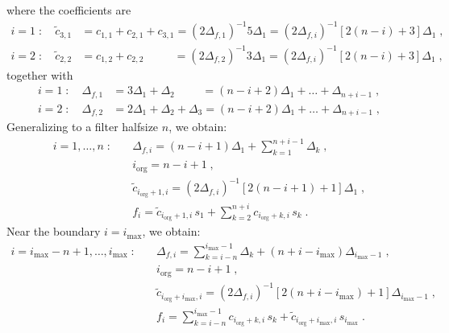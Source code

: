 where the coefficients are
\begin{subequations}
  \begin{align}
    i=1\;:\quad\tilde{c}_{3,1} &= c_{1,1}+c_{2,1}+c_{3,1} =(2\Delta_{f,1})^{-1}5\Delta_{1}
    =(2\Delta_{f,i})^{-1}[2(n-i)+3]\Delta_{1}\;,\\
    i=2\;:\quad\tilde{c}_{2,2} &= c_{1,2}+c_{2,2}\phantom{(+c_{3,1}} =(2\Delta_{f,2})^{-1}3\Delta_{1}
    =(2\Delta_{f,i})^{-1}[2(n-i)+3]\Delta_{1}\;,
  \end{align}
\end{subequations}
together with
\begin{subequations}
  \begin{align}
    i=1\;:\quad\Delta_{f,1}&=3\Delta_{1}+\Delta_{2}\phantom{+\Delta_{3})}=
    (n-i+2)\Delta_{1}+\ldots+\Delta_{n+i-1}\;,\\
    i=2\;:\quad\Delta_{f,2}&=2\Delta_{1}+\Delta_{2}+\Delta_{3}=
    (n-i+2)\Delta_{1}+\ldots+\Delta_{n+i-1}\;,
  \end{align}
\end{subequations}
Generalizing to a filter halfsize $n$, we obtain:
\begin{subequations}
  \begin{align}
    i=1,\ldots,n\;:\quad 
    & \Delta_{f,i} = (n-i+1)\Delta_{1}+\sum_{k=1}^{n+i-1}\Delta_{k} \;,\\
    & i_\mathrm{org}=n-i+1\;,\\
    &\tilde{c}_{i_\mathrm{org}+1,i} = (2\Delta_{f,i})^{-1}[2(n-i+1)+1]\Delta_{1}\;,\\
    &f_{i} =\tilde{c}_{i_\mathrm{org}+1,i}\,s_1+\sum_{k=2}^{n+i} c_{i_\mathrm{org}+k,i}\,s_{k} \;.
  \end{align}
\end{subequations}
Near the boundary $i=i_\mathrm{max}$, we obtain:
\begin{subequations}
  \begin{align}
    i=i_\mathrm{max}-n+1,\ldots,i_\mathrm{max}\;:\quad 
    & \Delta_{f,i} = \sum_{k=i-n}^{i_\mathrm{max}-1}\Delta_{k} +(n+i-i_\mathrm{max})\Delta_{i_\mathrm{max}-1}\;,\\
    & i_\mathrm{org}=n-i+1\;,\\
    &\tilde{c}_{i_\mathrm{org}+i_\mathrm{max},i} = (2\Delta_{f,i})^{-1}[2(n+i-i_\mathrm{max})+1]\Delta_{i_\mathrm{max}-1}\;,\\
    &f_{i} =\sum_{k=i-n}^{i_\mathrm{max}-1} c_{i_\mathrm{org}+k,i}\,s_{k}+\tilde{c}_{i_\mathrm{org}+i_\mathrm{max},i}\,s_{i_\mathrm{max}} \;.
  \end{align}
\end{subequations}

